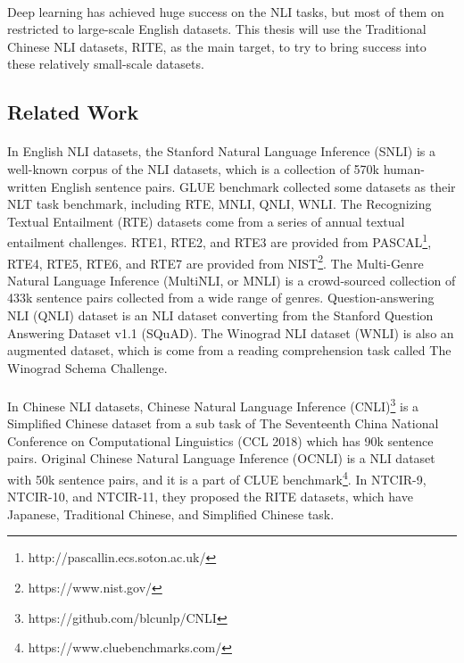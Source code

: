 \documentclass{article}
\begin{document}
\begin{CJK*}{UTF8}{bkai}
\paragraph{}
Deep learning has achieved huge success on the NLI tasks, but most of them on restricted to large-scale English datasets. This thesis will use the Traditional Chinese NLI datasets, RITE, as the main target, to try to bring success into these relatively small-scale datasets.

\subsection{Related Work}
\paragraph{}
In English NLI datasets, the Stanford Natural Language Inference (SNLI)\cite{snli:emnlp2015} is a well-known corpus of the NLI datasets, which is a collection of 570k human-written English sentence pairs. GLUE benchmark collected some datasets as their NLT task benchmark, including RTE, MNLI, QNLI, WNLI. The Recognizing Textual Entailment (RTE) datasets come from a series of annual textual entailment challenges. RTE1\cite{dagan2006pascal}, RTE2\cite{bar2006second}, and RTE3\cite{giampiccolo2007third} are provided from PASCAL\footnote{http://pascallin.ecs.soton.ac.uk/}, RTE4, RTE5\cite{bentivogli2009fifth}, RTE6, and RTE7 are provided from NIST\footnote{https://www.nist.gov/}. The Multi-Genre Natural Language Inference (MultiNLI, or MNLI)\cite{N18-1101} is a crowd-sourced collection of 433k sentence pairs collected from a wide range of genres. Question-answering NLI (QNLI)\cite{wang2019glue} dataset is an NLI dataset converting from the Stanford Question Answering Dataset v1.1 (SQuAD)\cite{rajpurkar2016squad}. The Winograd NLI dataset (WNLI) is also an augmented dataset, which is come from a reading comprehension task called The Winograd Schema Challenge\cite{levesque2011winograd}.

\paragraph{}
In Chinese NLI datasets, Chinese Natural Language Inference (CNLI)\footnote{https://github.com/blcunlp/CNLI} is a Simplified Chinese dataset from a sub task of The Seventeenth China National Conference on Computational Linguistics (CCL 2018) which has 90k sentence pairs. Original Chinese Natural Language Inference (OCNLI) is a NLI dataset with 50k sentence pairs, and it is a part of CLUE benchmark\footnote{https://www.cluebenchmarks.com/}. In NTCIR-9\cite{ntcir9rite1}, NTCIR-10\cite{ntcir10rite2}, and NTCIR-11\cite{ntcir11rite-val}, they proposed the RITE datasets, which have Japanese, Traditional Chinese, and Simplified Chinese task.


\end{CJK*}
\end{document}
